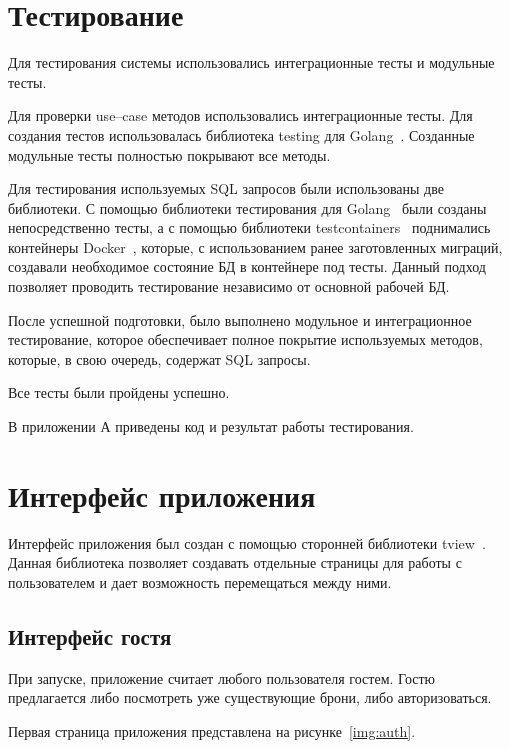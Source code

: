 \section{Тестирование}
Для тестирования системы использовались интеграционные тесты и модульные тесты.

Для проверки use--case методов использовались интеграционные тесты.
Для создания тестов использовалась библиотека testing для Golang~\cite{golang_testing}.
Созданные модульные тесты полностью покрывают все методы.

Для тестирования используемых SQL запросов были использованы две библиотеки.
С помощью библиотеки тестирования для Golang~\cite{golang_testing} были созданы непосредственно тесты, а с помощью библиотеки testcontainers~\cite{golang_testcontainers} поднимались контейнеры Docker~\cite{docker}, которые, с использованием ранее заготовленных миграций, создавали необходимое состояние БД в контейнере под тесты.
Данный подход позволяет проводить тестирование независимо от основной рабочей БД.

После успешной подготовки, было выполнено модульное и интеграционное тестирование, которое обеспечивает полное покрытие используемых методов, которые, в свою очередь, содержат SQL запросы.

Все тесты были пройдены успешно.

В приложении А приведены код и результат работы тестирования. 

\section{Интерфейс приложения}
Интерфейс приложения был создан с помощью сторонней библиотеки tview~\cite{golang_tview}.
Данная библиотека позволяет создавать отдельные страницы для работы с пользователем и дает возможность перемещаться между ними. 

\subsection{Интерфейс гостя}

При запуске, приложение считает любого пользователя гостем. 
Гостю предлагается либо посмотреть уже существующие брони, либо авторизоваться.

Первая страница приложения представлена на рисунке~\ref{img:auth}.




